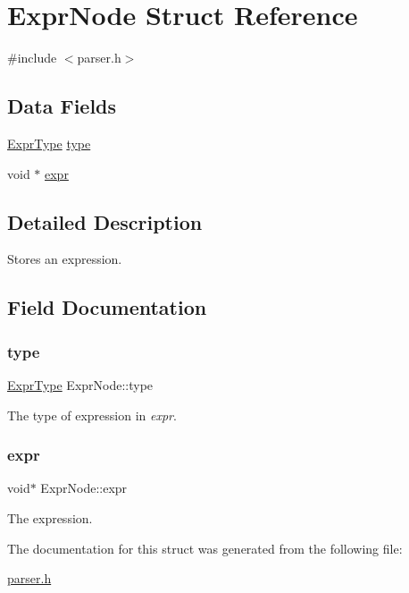 \hypertarget{struct_expr_node}{}\section{Expr\+Node Struct Reference}
\label{struct_expr_node}


{\ttfamily \#include $<$parser.\+h$>$}

\subsection*{Data Fields}
\begin{DoxyCompactItemize}
\item 
\hyperlink{parser_8h_a3e262b377dc15baba6e58438868decb7}{Expr\+Type} \hyperlink{struct_expr_node_ab5f285d791068c69dbca0610d8c36c99}{type}
\item 
void $\ast$ \hyperlink{struct_expr_node_a2c6ff3dccfa2e543a46e01763adab3a8}{expr}
\end{DoxyCompactItemize}


\subsection{Detailed Description}
Stores an expression. 

\subsection{Field Documentation}
\mbox{\label{struct_expr_node_ab5f285d791068c69dbca0610d8c36c99}} 
\subsubsection{\texorpdfstring{type}{type}}
{\footnotesize\ttfamily \hyperlink{parser_8h_a3e262b377dc15baba6e58438868decb7}{Expr\+Type} Expr\+Node\+::type}

The type of expression in {\itshape expr}. \mbox{\label{struct_expr_node_a2c6ff3dccfa2e543a46e01763adab3a8}} 
\subsubsection{\texorpdfstring{expr}{expr}}
{\footnotesize\ttfamily void$\ast$ Expr\+Node\+::expr}

The expression. 

The documentation for this struct was generated from the following file\+:\begin{DoxyCompactItemize}
\item 
\hyperlink{parser_8h}{parser.\+h}\end{DoxyCompactItemize}
